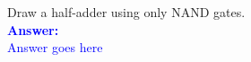 \item{}
Draw a half-adder using only NAND gates.\\[12pt]
\ifanswers
\textcolor{blue}{
\textbf{Answer:}\\[12pt]
Answer goes here
}
\newpage
\fi

